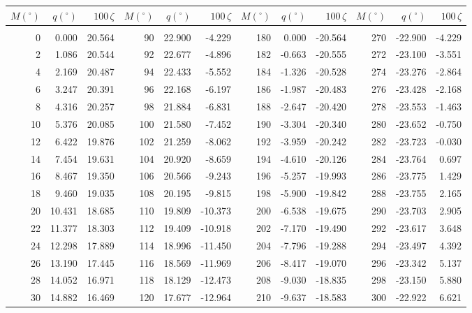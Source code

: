 \newpage
\begin{table}\centering
\small{ \begin{tabular}{rrr|rrr|rrr|rrr}
$M(^\circ)$ & $q(^\circ)$  & $100\,\zeta$ & $M(^\circ)$ & $q(^\circ)$  & $100\,\zeta$ & $M(^\circ)$ & $q(^\circ)$  & $100\,\zeta$& $M(^\circ)$ & $q(^\circ)$  & $100\,\zeta$\\\hline
&&&&&&&&&&&\\[-1.75ex]
  0 &   0.000 & 20.564 &  90 &  22.900 & -4.229 & 180 &   0.000 & -20.564 & 270 & -22.900 & -4.229\\
  2 &   1.086 & 20.544 &  92 &  22.677 & -4.896 & 182 &  -0.663 & -20.555 & 272 & -23.100 & -3.551\\
  4 &   2.169 & 20.487 &  94 &  22.433 & -5.552 & 184 &  -1.326 & -20.528 & 274 & -23.276 & -2.864\\
  6 &   3.247 & 20.391 &  96 &  22.168 & -6.197 & 186 &  -1.987 & -20.483 & 276 & -23.428 & -2.168\\
  8 &   4.316 & 20.257 &  98 &  21.884 & -6.831 & 188 &  -2.647 & -20.420 & 278 & -23.553 & -1.463\\
 10 &   5.376 & 20.085 & 100 &  21.580 & -7.452 & 190 &  -3.304 & -20.340 & 280 & -23.652 & -0.750\\
 12 &   6.422 & 19.876 & 102 &  21.259 & -8.062 & 192 &  -3.959 & -20.242 & 282 & -23.723 & -0.030\\
 14 &   7.454 & 19.631 & 104 &  20.920 & -8.659 & 194 &  -4.610 & -20.126 & 284 & -23.764 &  0.697\\
 16 &   8.467 & 19.350 & 106 &  20.566 & -9.243 & 196 &  -5.257 & -19.993 & 286 & -23.775 &  1.429\\
 18 &   9.460 & 19.035 & 108 &  20.195 & -9.815 & 198 &  -5.900 & -19.842 & 288 & -23.755 &  2.165\\
 20 &  10.431 & 18.685 & 110 &  19.809 & -10.373 & 200 &  -6.538 & -19.675 & 290 & -23.703 &  2.905\\
 22 &  11.377 & 18.303 & 112 &  19.409 & -10.918 & 202 &  -7.170 & -19.490 & 292 & -23.617 &  3.648\\
 24 &  12.298 & 17.889 & 114 &  18.996 & -11.450 & 204 &  -7.796 & -19.288 & 294 & -23.497 &  4.392\\
 26 &  13.190 & 17.445 & 116 &  18.569 & -11.969 & 206 &  -8.417 & -19.070 & 296 & -23.342 &  5.137\\
 28 &  14.052 & 16.971 & 118 &  18.129 & -12.473 & 208 &  -9.030 & -18.835 & 298 & -23.150 &  5.880\\
 30 &  14.882 & 16.469 & 120 &  17.677 & -12.964 & 210 &  -9.637 & -18.583 & 300 & -22.922 &  6.621\\

\end{tabular}}
\end{table}
